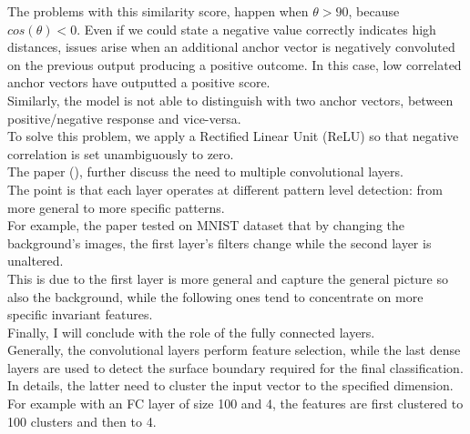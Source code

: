 \documentclass[LaM,binding=0.6cm]{sapthesis}
\begin{document}
The problems with this similarity score, happen when $\theta>90$, because $cos(\theta)<0$. Even if we could state a negative value correctly indicates high distances, issues arise when an additional anchor vector is negatively convoluted on the previous output producing a positive outcome. In this case, low correlated anchor vectors have outputted a positive score.\\Similarly, the model is not able to distinguish with two anchor vectors, between positive/negative response and vice-versa.\\To solve this problem, we apply a Rectified Linear Unit (ReLU) so that negative correlation is set unambiguously to zero.\\The paper (\cite{cnninter}), further discuss the need to multiple convolutional layers.\\The point is that each layer operates at different pattern level detection: from more general to more specific patterns.\\For example, the paper tested on MNIST dataset that by changing the background's images, the first layer's filters change while the second layer is unaltered.\\This is due to the first layer is more general and capture the general picture so also the background, while the following ones tend to concentrate on more specific invariant features.\\Finally, I will conclude with the role of the fully connected layers.\\Generally, the convolutional layers perform feature selection, while the last dense layers are used to detect the surface boundary required for the final classification.\\In details, the latter need to cluster the input vector to the specified dimension. For example with an FC layer of size 100 and 4, the features are first clustered to 100 clusters and then to 4.
\end{document}
